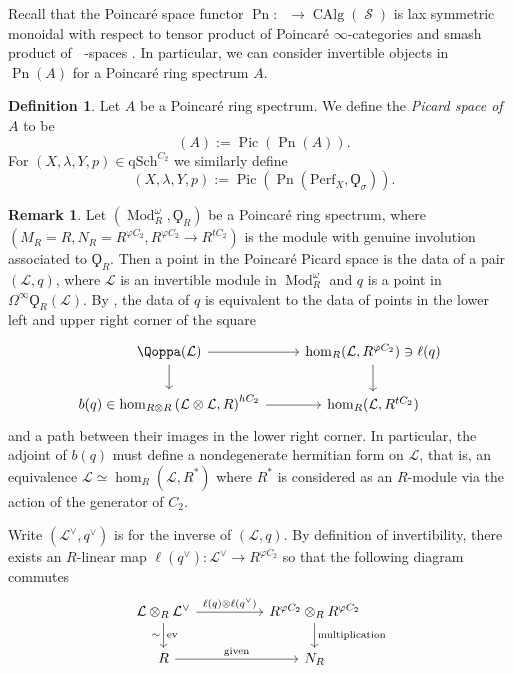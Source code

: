 \documentclass{article}
\DeclareMathOperator{\CAlg}{CAlg} %
\DeclareMathOperator{\Catp}{Cat^p_\infty} %
\DeclareMathOperator{\Einfty}{\mathbf{E}_\infty} %
\DeclareMathOperator{\Mod}{Mod} %
\DeclareMathOperator{\Pic}{Pic} %
\DeclareMathOperator{\Picp}{Pic^p} %
\DeclareMathOperator{\Pn}{Pn} %
\DeclareMathOperator{\Spaces}{\mathcal{S}} %
\newcommand{\perf}{\mathrm{Perf}}
\theoremstyle{definition}
\newtheorem{definition}[equation]{Definition}
\newtheorem{remark}[equation]{Remark}
\newcommand{\Lucy}[1]{\todo[color=cyan]{\linespread{1}\footnotesize L: #1}}
\begin{document}
Recall that the Poincaré space functor $ \Pn \colon \Catp \to \CAlg(\Spaces) $ is lax symmetric monoidal with respect to tensor product of Poincaré $ \infty $-categories and smash product of $ \Einfty $-spaces \cite[Corollary 5.2.8]{CDHHLMNNSI}. In particular, we can consider invertible objects in $\Pn(A)$ for a Poincaré ring spectrum $A$.

\begin{definition}
    \label{definition:poincare_picard_space}
    Let $A$ be a Poincaré ring spectrum. We define the \emph{Picard space of $A$} to be $$\Picp(A):=\Pic(\Pn(A)).$$
    For $(X,\lambda, Y, p)\in \mathrm{qSch}^{C_2}$ we similarly define \[\Picp(X,\lambda,Y,p):= \Pic(\Pn(\perf_X,\Qoppa_{\sigma})).\]
\end{definition}

\begin{remark}
    \label{remark:poincare_picard_points_desc}
    Let $ \left(\Mod_R^\omega, \Qoppa_R \right)$ be a Poincaré ring spectrum, where $(M_R=R, N_R= R^{\varphi C_2}, R^{\varphi C_2}\to R^{tC_2})$ is the module with genuine involution associated to $ \Qoppa_R $. 
    Then a point in the Poincaré Picard space is the data of a pair $ (\mathcal{L}, q ) $, where $ \mathcal{L} $ is an invertible module in $ \Mod_R^\omega $ and $ q $ is a point in $ \Omega^\infty\Qoppa_R(\mathcal{L}) $. 
    By \cite[Proposition 1.3.11]{CDHHLMNNSI}, the data of $ q $ is equivalent to the data of points in the lower left and upper right corner of the square
    \begin{equation}
    \begin{tikzcd}
        \Qoppa(\mathcal{L}) \ar[r] \ar[d] & \hom_R(\mathcal{L}, R^{\varphi C_2}) \ni \ell(q) \ar[d] \\
        b(q) \in \hom_{R \otimes R}\left(\mathcal{L} \otimes \mathcal{L}, R\right)^{hC_2} \ar[r] & \hom_R(\mathcal{L}, R^{tC_2})
    \end{tikzcd}
    \end{equation} 
    and a path between their images in the lower right corner. 
    In particular, the adjoint of $ b(q) $ must define a nondegenerate hermitian form on $ \mathcal{L} $, that is, an equivalence $ \mathcal{L} \simeq \hom_{R}(\mathcal{L}, R^*) $ where $ R^* $ is considered as an $ R $-module via the action of the generator of $ C_2 $. \Lucy{add equivariance/symmetry data}

    Write $ (\mathcal{L}^\vee,q^\vee) $ is for the inverse of $ (\mathcal{L},q) $. 
    By definition of invertibility, there exists an $ R $-linear map $ \ell(q^\vee) \colon \mathcal{L}^\vee \to R^{\varphi C_2} $ so that the following diagram commutes
    \begin{equation}\label{diagram:pnpic_linear_part_condition}
    \begin{tikzcd}[column sep=huge]
        \mathcal{L} \otimes_R \mathcal{L}^\vee \ar[d,"\mathrm{ev}", "\sim"']  \ar[r,"{\ell(q) \otimes \ell(q^\vee)}"] & R^{\varphi C_2} \otimes_R R^{\varphi C_2} \ar[d,"\mathrm{multiplication}"] \\
        R \ar[r,"\mathrm{given}"] & N_R   
    \end{tikzcd}
    \end{equation} 
\end{remark}
\end{document}

